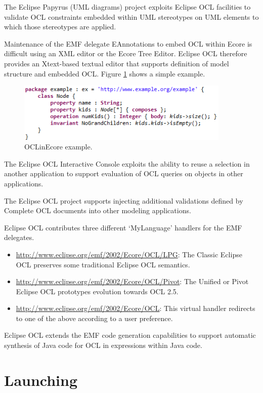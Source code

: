 \documentclass[a4paper]{article}
\begin{document}
The Eclipse Papyrus (UML diagrams) project exploits Eclipse OCL facilities to validate OCL constraints embedded within UML stereotypes on UML elements to which those stereotypes are applied.

Maintenance of the EMF delegate EAnnotations to embed OCL within Ecore is difficult using an XML editor or the Ecore Tree Editor. Eclipse OCL therefore provides an Xtext-based textual editor that supports definition of model structure and embedded OCL. Figure \ref{fig:OCLinEcore} shows a simple example.
\begin{figure}
  \begin{center}
    \includegraphics[width=4.0in]{OCLinEcore.png}
  \end{center}
  \caption{OCLinEcore example.}
  \label{fig:OCLinEcore}
\end{figure}

The Eclipse OCL Interactive Console exploits the ability to reuse a selection in another application to support evaluation of OCL queries on objects in other applications.

The Eclipse OCL project supports injecting additional validations defined by Complete OCL documents into other modeling applications.

Eclipse OCL contributes three different `MyLanguage' handlers for the EMF delegates.

\begin{itemize}
\item \url{http://www.eclipse.org/emf/2002/Ecore/OCL/LPG}: The Classic Eclipse OCL preserves some traditional Eclipse OCL semantics.
\item \url{http://www.eclipse.org/emf/2002/Ecore/OCL/Pivot}: The Unified or Pivot Eclipse OCL prototypes evolution towards OCL 2.5.
\item \url{http://www.eclipse.org/emf/2002/Ecore/OCL}: This virtual handler redirects to one of the above according to a user preference.
\end{itemize}

Eclipse OCL extends the EMF code generation capabilities to support automatic synthesis of Java code for OCL in expressions within Java code.
 
\section{Launching}\label{Launching}
\end{document}
